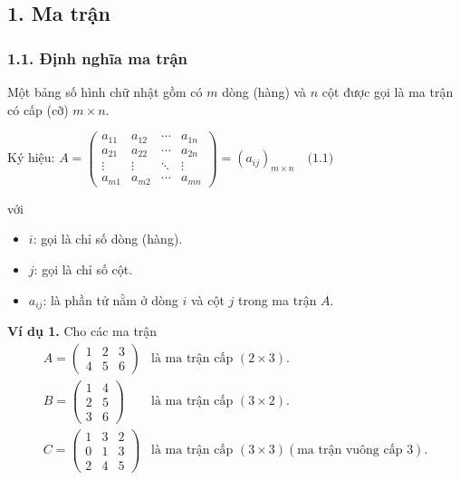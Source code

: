 \subsection*{1. Ma trận}
\subsubsection*{1.1. Định nghĩa ma trận}
Một bảng số hình chữ nhật gồm có $m$ dòng (hàng) và $n$ cột được gọi là ma trận có cấp (cỡ) $m \times n$.

\begin{center}
Ký hiệu: $A = \begin{pmatrix}
a_{11} & a_{12} & \cdots & a_{1n} \\
a_{21} & a_{22} & \cdots & a_{2n} \\
\vdots & \vdots & \ddots & \vdots \\
a_{m1} & a_{m2} & \cdots & a_{mn}
\end{pmatrix} = \left( a_{ij} \right)_{m \times n} \quad \text{(1.1)}$

\end{center}

\vspace{10pt}
với
\begin{itemize}
    \item $i$: gọi là chỉ số dòng (hàng).
    \item $j$: gọi là chỉ số cột.
    \item $a_{ij}$: là phần tử nằm ở dòng $i$ và cột $j$ trong ma trận $A$.
\end{itemize}

\textbf{Ví dụ 1.} Cho các ma trận
\[
\begin{array}{ll}
A = \begin{pmatrix}
1 & 2 & 3 \\
4 & 5 & 6
\end{pmatrix} & \text{là ma trận cấp } (2 \times 3). \\
B = \begin{pmatrix}
1 & 4 \\
2 & 5 \\
3 & 6
\end{pmatrix} & \text{là ma trận cấp } (3 \times 2). \\
C = \begin{pmatrix}
1 & 3 & 2 \\
0 & 1 & 3 \\
2 & 4 & 5
\end{pmatrix} & \text{là ma trận cấp } (3 \times 3) (\text{ma trận vuông cấp } 3).
\end{array}
\]

